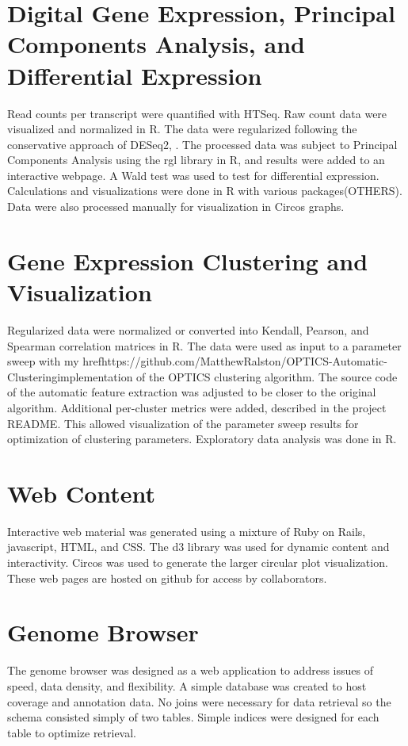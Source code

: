 \section{Digital Gene Expression, Principal Components Analysis, and Differential Expression}
Read counts per transcript were quantified with HTSeq\cite{48}. Raw count data were visualized and normalized in R. The data were regularized following the conservative approach of DESeq2\cite{52}, \cite{53}. The processed data was subject to Principal Components Analysis using the rgl library in R, and results were added to an interactive webpage. A Wald test was used to test for differential expression. Calculations and visualizations were done in R with various packages(OTHERS)\cite{55}. Data were also processed manually for visualization in Circos graphs\cite{50}.

\section{Gene Expression Clustering and Visualization}
Regularized data were normalized or converted into Kendall, Pearson, and Spearman correlation matrices in R. The data were used as input to a parameter sweep with my href{https://github.com/MatthewRalston/OPTICS-Automatic-Clustering}{implementation} of the OPTICS clustering algorithm. The source code of the automatic feature extraction was adjusted to be closer to the original algorithm.\cite{187} Additional per-cluster metrics were added, described in the project README. This allowed visualization of the parameter sweep results for optimization of clustering parameters. Exploratory data analysis was done in R.

\section{Web Content}
Interactive web material was generated using a mixture of Ruby on Rails, javascript, HTML, and CSS. The d3 library\cite{190} was used for dynamic content and interactivity. Circos was used to generate the larger circular plot visualization. These web pages are hosted on github for access by collaborators.


\section{Genome Browser}\label{methods:browser}
The genome browser was designed as a web application to address issues of speed, data density, and flexibility. A simple database was created to host coverage and annotation data. No joins were necessary for data retrieval so the schema consisted simply of two tables. Simple indices were designed for each table to optimize retrieval. 

